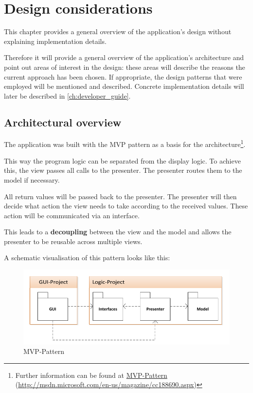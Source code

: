 \chapter{Design considerations}\label{ch:design} %

This chapter provides a general overview of the application's design without explaining implementation details.

Therefore it will provide a general overview of the application's architecture and point out areas of interest in the design: these areas will describe the reasons the current approach has been chosen. If appropriate, the design patterns that were employed will be mentioned and described. Concrete implementation details will later be described in \autoref{ch:developer_guide}.

\section{Architectural overview}
\label{sec:architectural_overview}

The application was built with the \ac{MVP} pattern as a basis for the architecture\footnote{Further information can be found at \href{http://msdn.microsoft.com/en-us/magazine/cc188690.aspx}{\ac{MVP}-Pattern} (\url{http://msdn.microsoft.com/en-us/magazine/cc188690.aspx})}.

This way the program logic can be separated from the display logic. To achieve this, the view passes all calls to the presenter. The presenter routes them to the model if necessary. 

All return values will be passed back to the presenter. The presenter will then decide what action the view needs to take according to the received values. These action will be communicated via an interface.

This leads to a \textbf{decoupling} between the view and the model and allows the presenter to be reusable across multiple views.

A schematic visualisation of this pattern looks like this:

\begin{figure}[H]
\begin{center}
\includegraphics[width=\textwidth]{gfx/mvp.pdf}
\caption{\ac{MVP}-Pattern}
\label{fig:mvp}
\end{center}
\end{figure}

